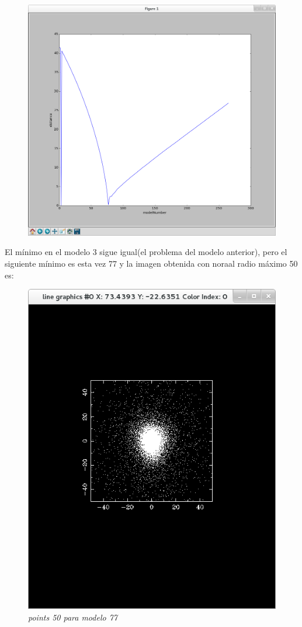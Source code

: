 \documentclass[12pt]{book}
\begin{document}
\begin{itemize}
\begin{figure}[!h]
 \centering
 \includegraphics[scale=0.5]{imgDistcon2.png}
 \caption{\emph{}}
 \label{Fig: 5}
\end{figure}
\end{itemize}

El mínimo en el modelo 3 sigue igual(el problema del modelo anterior), pero el siguiente mínimo es esta vez 77 y la imagen obtenida con noraal radio máximo 50 es:

\begin{figure}[!h]
 \centering
 \includegraphics[scale=0.5]{imgConModel77Points50.png}
 \caption{\emph{points 50 para modelo 77}}
 \label{Fig: 5}
\end{figure}
\end{document}
